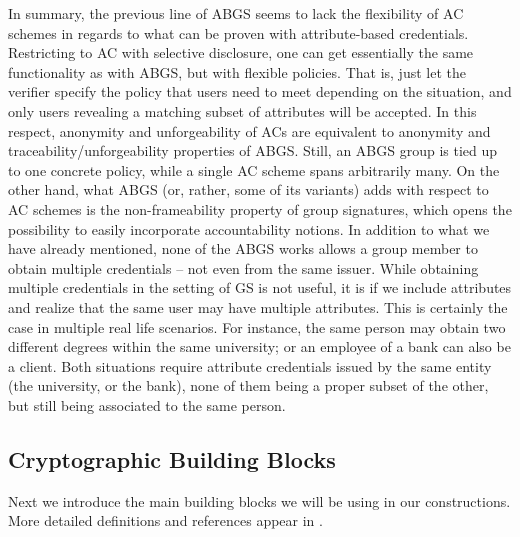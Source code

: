In summary, the previous line of ABGS seems to lack the flexibility of AC
schemes in regards to what can be proven with attribute-based credentials.
Restricting to AC with selective disclosure, one can get essentially the same
functionality as with ABGS, but with flexible policies. That is, just let
the verifier specify the policy that users need to meet depending on the
situation, and only users revealing a matching subset of attributes will be
accepted. In this respect, anonymity and unforgeability of ACs are equivalent to
anonymity and traceability/unforgeability properties of ABGS. Still, an ABGS
group is tied up to one concrete policy, while a single AC scheme spans
arbitrarily many.
%
On the other hand, what ABGS (or, rather, some of its variants) adds with
respect to AC schemes is the non-frameability property of group signatures,
which opens the possibility to easily incorporate accountability notions.
%
In addition to what we have already mentioned, none of the ABGS works allows
a group member to obtain multiple credentials -- not even from the same issuer.
While obtaining multiple credentials in the setting of GS is not useful, it is
if we include attributes and realize that the same user may have multiple
attributes. This is certainly the case in multiple real life scenarios. For
instance, the same person may obtain two different degrees within the same
university; or an employee of a bank can also be a client. Both situations
require attribute credentials issued by the same entity (the university, or
the bank), none of them being a proper subset of the other, but still being
associated to the same person.


\subsection{Cryptographic Building Blocks}
\label{ssec:cryptobblocks}

Next we introduce the main building blocks we will be using in our
constructions. More detailed definitions and references appear in
.

